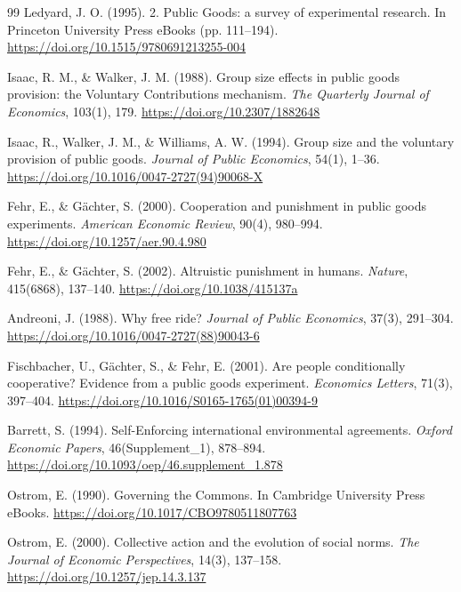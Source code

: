\documentclass[12pt,letterpaper]{report}
\begin{document}
\begin{thebibliography}{99}
Ledyard, J. O. (1995). 2. Public Goods: a survey of experimental research. In Princeton University Press eBooks (pp. 111--194). \url{https://doi.org/10.1515/9780691213255-004}

Isaac, R. M., \& Walker, J. M. (1988). Group size effects in public goods provision: the Voluntary Contributions mechanism. \textit{The Quarterly Journal of Economics}, 103(1), 179. \url{https://doi.org/10.2307/1882648}

Isaac, R., Walker, J. M., \& Williams, A. W. (1994). Group size and the voluntary provision of public goods. \textit{Journal of Public Economics}, 54(1), 1--36. \url{https://doi.org/10.1016/0047-2727(94)90068-X}

Fehr, E., \& G\"achter, S. (2000). Cooperation and punishment in public goods experiments. \textit{American Economic Review}, 90(4), 980--994. \url{https://doi.org/10.1257/aer.90.4.980}

Fehr, E., \& G\"achter, S. (2002). Altruistic punishment in humans. \textit{Nature}, 415(6868), 137--140. \url{https://doi.org/10.1038/415137a}

Andreoni, J. (1988). Why free ride? \textit{Journal of Public Economics}, 37(3), 291--304. \url{https://doi.org/10.1016/0047-2727(88)90043-6}

Fischbacher, U., G\"achter, S., \& Fehr, E. (2001). Are people conditionally cooperative? Evidence from a public goods experiment. \textit{Economics Letters}, 71(3), 397--404. \url{https://doi.org/10.1016/S0165-1765(01)00394-9}

Barrett, S. (1994). Self-Enforcing international environmental agreements. \textit{Oxford Economic Papers}, 46(Supplement\_1), 878--894. \url{https://doi.org/10.1093/oep/46.supplement_1.878}

Ostrom, E. (1990). Governing the Commons. In Cambridge University Press eBooks. \url{https://doi.org/10.1017/CBO9780511807763}

Ostrom, E. (2000). Collective action and the evolution of social norms. \textit{The Journal of Economic Perspectives}, 14(3), 137--158. \url{https://doi.org/10.1257/jep.14.3.137}

\end{thebibliography}
\end{document}
